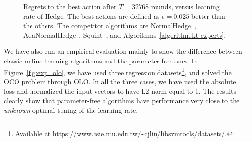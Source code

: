 \begin{figure}[t]
\begin{center}
\caption{\footnotesize{Regrets to the best action after $T = 32768$ rounds, versus learning rate of Hedge. The best actions are defined as $\epsilon=0.025$ better than the others. The competitor algorithms are NormalHedge~\cite{Chaudhuri-Freund-Hsu-2009}, AdaNormalHedge~\cite{Luo-Schapire-2015}, Squint~\cite{Koolen-van-Erven-2015}, and Algorithms~\ref{algorithm:kt-experts}.}}
\label{fig:exp_lea}
\end{center}
\end{figure}

We have also run an empirical evaluation mainly to show the difference between
classic online learning algorithms and the parameter-free ones. In
Figure~\ref{fig:exp_olo}, we have used three regression
datasets\footnote{Available at
\url{https://www.csie.ntu.edu.tw/~cjlin/libsvmtools/datasets/}.}, and solved
the \ac{OCO} problem through \ac{OLO}. In all the three cases, we have used the
absolute loss and normalized the input vectors to have L2 norm equal to 1. The
results clearly show that parameter-free algorithms have performance very close
to the \emph{unknown} optimal tuning of the learning rate.

